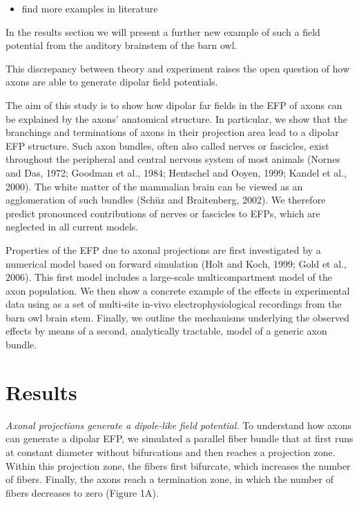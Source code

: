 \documentclass[]{article}
\providecommand{\tightlist}{%
  \setlength{\itemsep}{0pt}\setlength{\parskip}{0pt}}
\begin{document}
\begin{itemize}
\tightlist
\item
  find more examples in literature
\end{itemize}

In the results section we will present a further new example of such a
field potential from the auditory brainstem of the barn owl.

This discrepancy between theory and experiment raises the open question
of how axons are able to generate dipolar field potentials.

The aim of this study is to show how dipolar far fields in the EFP of
axons can be explained by the axons' anatomical structure. In
particular, we show that the branchings and terminations of axons in
their projection area lead to a dipolar EFP structure. Such axon
bundles, often also called nerves or fascicles, exist throughout the
peripheral and central nervous system of most animals (Nornes and Das,
1972; Goodman et al., 1984; Hentschel and Ooyen, 1999; Kandel et al.,
2000). The white matter of the mammalian brain can be viewed as an
agglomeration of such bundles (Schüz and Braitenberg, 2002). We
therefore predict pronounced contributions of nerves or fascicles to
EFPs, which are neglected in all current models.

Properties of the EFP due to axonal projections are first investigated
by a numerical model based on forward simulation (Holt and Koch, 1999;
Gold et al., 2006). This first model includes a large-scale
multicompartment model of the axon population. We then show a concrete
example of the effects in experimental data using as a set of multi-site
in-vivo electrophysiological recordings from the barn owl brain stem.
Finally, we outline the mechanisms underlying the observed effects by
means of a second, analytically tractable, model of a generic axon
bundle.

\section{Results}\label{results}

\emph{Axonal projections generate a dipole-like field potential.} To
understand how axons can generate a dipolar EFP, we simulated a parallel
fiber bundle that at first runs at constant diameter without
bifurcations and then reaches a projection zone. Within this projection
zone, the fibers first bifurcate, which increases the number of fibers.
Finally, the axons reach a termination zone, in which the number of
fibers decreases to zero (Figure 1A).
\end{document}
